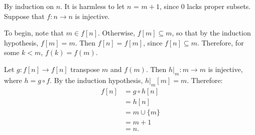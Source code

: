 \documentclass[12pt]{article}
\begin{document}
By induction on $n$. It is harmless to let $n$ = $m + 1$, since
$0$ lacks proper subsets. Suppose that $f : n \to n$ is injective.

To begin, note that $m \in f[n]$. Otherwise, $f[m] \subseteq m$,
so that by the induction hypothesis, $f[m] = m$. Then $f[n] =
f[m]$, since $f[n] \subseteq m$. Therefore, for some $k < m$,
$f(k) = f(m)$.

Let $g : f[n] \to f[n]$ transpose $m$ and $f(m)$. Then $h \vert_m
: m \to m$ is injective, where $h = g \circ f$. By the induction
hypothesis, $h \vert_m[m] = m$. Therefore:
\begin{align*}
f[n] &= g \circ h[n]
\\
&= h[n]
\\
&= m \cup \{m\}
\\
&= m + 1
\\
&= n \text{.}
\end{align*}

\end{document}
